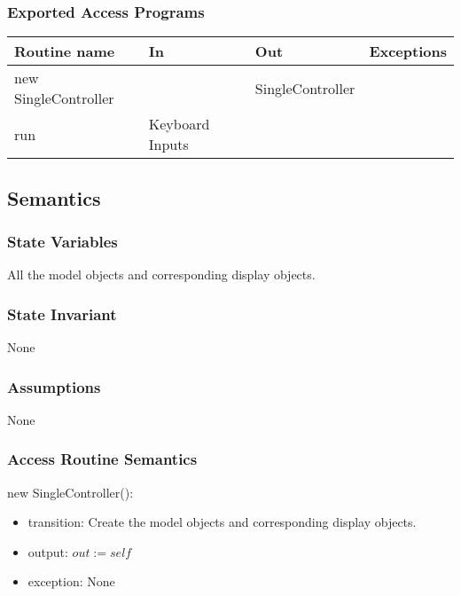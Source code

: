 \documentclass[12pt]{article}
\begin{document}
\subsubsection*{Exported Access Programs}
\begin{tabular}{| l | l | l | p{5cm} |}
\hline
\textbf{Routine name} & \textbf{In} & \textbf{Out} & \textbf{Exceptions}\\
\hline
new SingleController &  & SingleController & \\
\hline
run & Keyboard Inputs &  & \\
\hline
\end{tabular}

\subsection*{Semantics}
\subsubsection*{State Variables}
All the model objects and corresponding display objects.
\subsubsection*{State Invariant}
None
\subsubsection*{Assumptions}
None
\subsubsection*{Access Routine Semantics}
\noindent new SingleController():
\begin{itemize}
\item transition: Create the model objects and corresponding display objects.
\item output: $out := \mathit{self}$
\item exception: None
\end{itemize}
\end{document}
